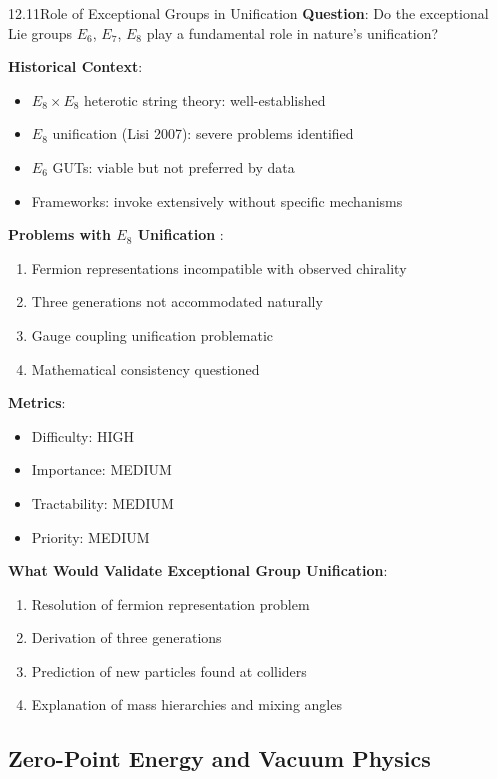 \begin{openproblem}{12.11}{Role of Exceptional Groups in Unification}
\textbf{Question}: Do the exceptional Lie groups $E_6$, $E_7$, $E_8$ play a fundamental role in nature's unification?

\textbf{Historical Context}:
\begin{itemize}
    \item $E_8 \times E_8$ heterotic string theory: well-established
    \item $E_8$ unification (Lisi 2007): severe problems identified
    \item $E_6$ GUTs: viable but not preferred by data
    \item Frameworks: invoke extensively without specific mechanisms
\end{itemize}

\textbf{Problems with $E_8$ Unification} \cite{distler2009e8}:
\begin{enumerate}
    \item Fermion representations incompatible with observed chirality
    \item Three generations not accommodated naturally
    \item Gauge coupling unification problematic
    \item Mathematical consistency questioned
\end{enumerate}

\textbf{Metrics}:
\begin{itemize}
    \item Difficulty: HIGH
    \item Importance: MEDIUM
    \item Tractability: MEDIUM
    \item Priority: MEDIUM
\end{itemize}

\textbf{What Would Validate Exceptional Group Unification}:
\begin{enumerate}
    \item Resolution of fermion representation problem
    \item Derivation of three generations
    \item Prediction of new particles found at colliders
    \item Explanation of mass hierarchies and mixing angles
\end{enumerate}
\end{openproblem}

\subsection{Zero-Point Energy and Vacuum Physics}

